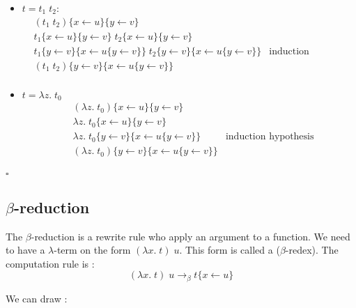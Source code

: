 \documentclass{article}
\theoremstyle{plain}
\theoremstyle{plain}
\renewcommand\qedsymbol{$\square$}
\begin{document}
\begin{itemize}
    \item $t = t_1\; t_2$:
      \begin{align*}
        &(t_1\;t_2)\{x\leftarrow u\}\{y\leftarrow v\} \\
        &t_1\{x\leftarrow u\}\{y\leftarrow v\}\;t_2\{x\leftarrow u\}\{y\leftarrow v\} \\
        &t_1\{y\leftarrow v\}\{x\leftarrow u\{y\leftarrow v\}\}\;
         t_2\{y\leftarrow v\}\{x\leftarrow u\{y\leftarrow v\}\} &
         \text{induction hypothesis} \\
        &(t_1\;t_2)\{y\leftarrow v\}\{x\leftarrow u\{y\leftarrow v\}\}\\
      \end{align*}

    \item $t = \lambda z.\;t_0$
      \begin{align*}
        &(\lambda z.\;t_0)\{x\leftarrow u\}\{y\leftarrow v\} \\
        &\lambda z.\;t_0\{x\leftarrow u\}\{y\leftarrow v\} \\
        &\lambda z.\;t_0\{y\leftarrow v\}\{x\leftarrow u\{y\leftarrow v\}\} &
        \text{induction hypothesis}\\
        &(\lambda z.\;t_0)\{y\leftarrow v\}\{x\leftarrow u\{y\leftarrow v\}\} \\
      \end{align*}

  \end{itemize}
  \qedsymbol

  \subsection{$\beta$-reduction}

    The $\beta$-reduction is a rewrite rule who apply an argument to a function.
    We need to have a $\lambda$-term on the form $(\lambda x.\;t)\; u$. This
    form is called a ($\beta$-redex). The computation rule is :
    \[(\lambda x.\;t)\; u \to_\beta t\{x \leftarrow u\}\]

    We can draw :
\end{document}
